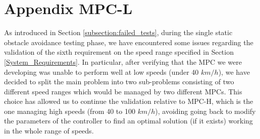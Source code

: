 \appendix
\section{Appendix MPC-L} \label{AppendixA}
As introduced in Section \ref{subsection:failed_tests}, during the single static obstacle avoidance testing phase, we have encountered some issues regarding the validation of the sixth requirement on the speed range specified in Section \ref{System_Requirements}. In particular, after verifying that the MPC we were developing was unable to perform well at low speeds (under 40 $km/h$), we have decided to split the main problem into two sub-problems consisting of two different speed ranges which would be managed by two different MPCs.
This choice has allowed us to continue the validation relative to MPC-H, which is the one managing high speeds (from 40 to 100 $km/h$), avoiding going back to modify the parameters of the controller to find an optimal solution (if it exists) working in the whole range of speeds.

